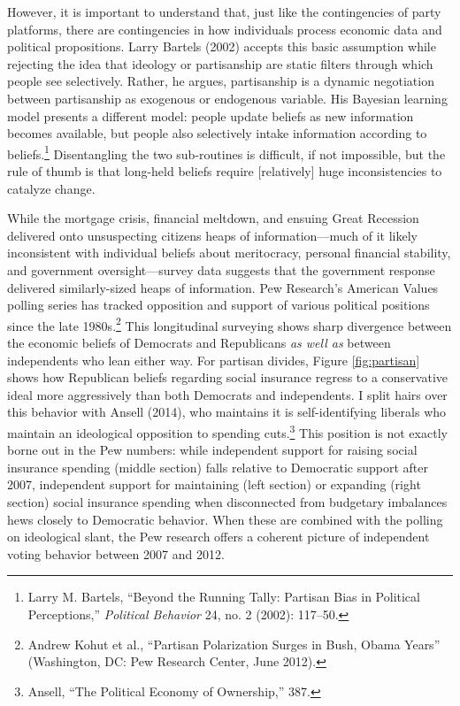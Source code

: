\documentclass[12pt,oneside]{psthesis}
\begin{document}
However, it is important to understand that, just like the contingencies of party platforms, there are contingencies in how individuals process economic data and political propositions.
Larry Bartels (2002) accepts this basic assumption while rejecting the idea that ideology or partisanship are static filters through which people see selectively.
Rather, he argues, partisanship is a dynamic negotiation between partisanship as exogenous or endogenous variable.
His Bayesian learning model presents a different model: people update beliefs as new information becomes available, but people also selectively intake information according to beliefs.\footnote{Larry M. Bartels, ``Beyond the Running Tally: Partisan Bias in Political Perceptions,'' \emph{Political Behavior} 24, no. 2 (2002): 117--50.}
Disentangling the two sub-routines is difficult, if not impossible, but the rule of thumb is that long-held beliefs require {[}relatively{]} huge inconsistencies to catalyze change.

While the mortgage crisis, financial meltdown, and ensuing Great Recession delivered onto unsuspecting citizens heaps of information---much of it likely inconsistent with individual beliefs about meritocracy, personal financial stability, and government oversight---survey data suggests that the government response delivered similarly-sized heaps of information.
Pew Research's American Values polling series has tracked opposition and support of various political positions since the late 1980s.\footnote{Andrew Kohut et al., ``Partisan Polarization Surges in Bush, Obama Years'' (Washington, DC: Pew Research Center, June 2012).}
This longitudinal surveying shows sharp divergence between the economic beliefs of Democrats and Republicans \emph{as well as} between independents who lean either way.
For partisan divides, Figure \ref{fig:partisan} shows how Republican beliefs regarding social insurance regress to a conservative ideal more aggressively than both Democrats and independents.
I split hairs over this behavior with Ansell (2014), who maintains it is self-identifying liberals who maintain an ideological opposition to spending cuts.\footnote{Ansell, ``The Political Economy of Ownership,'' 387.}
This position is not exactly borne out in the Pew numbers: while independent support for raising social insurance spending (middle section) falls relative to Democratic support after 2007, independent support for maintaining (left section) or expanding (right section) social insurance spending when disconnected from budgetary imbalances hews closely to Democratic behavior.
When these are combined with the polling on ideological slant, the Pew research offers a coherent picture of independent voting behavior between 2007 and 2012.
\end{document}
